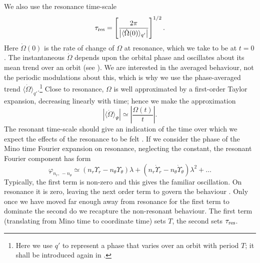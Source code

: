 We also use the resonance time-scale
\begin{equation}
\tau_\mathrm{res} = \left[\dfrac{2\pi}{\left|\langle\dot{\Omega}(0)\rangle_{q'}\right|}\right]^{1/2}.
\label{eq:t-res}
\end{equation}
Here $\dot{\Omega}(0)$ is the rate of change of $\Omega$ at resonance, which we take to be at $t = 0$. The instantaneous $\dot{\Omega}$ depends upon the orbital phase and oscillates about its mean trend over an orbit (see ). We are interested in the averaged behaviour, not the periodic modulations about this, which is why we use the phase-averaged trend $\langle\dot{\Omega}\rangle_{q'}$.\footnote{Here we use $q'$ to represent a phase that varies over an orbit with period $T$; it shall be introduced again in .} Close to resonance, $\Omega$ is well approximated by a first-order Taylor expansion, decreasing linearly with time; hence we make the approximation
\begin{equation}
\left|\langle\dot{\Omega}\rangle_\Psi\right| \simeq \left|\dfrac{\Omega(t)}{t}\right|.
\end{equation}
The resonant time-scale should give an indication of the time over which we expect the effects of the resonance to be felt \citep{Bosley1992}. If we consider the phase of the Mino time Fourier expansion on resonance, neglecting the constant, the resonant Fourier component has form
\begin{equation}
\varphi_{n_r,\,-n_\theta} \simeq \left(n_r\Upsilon_r - n_\theta\Upsilon_\theta\right)\lambda + \left(n_r\dot{\Upsilon}_r - n_\theta\dot{\Upsilon}_\theta\right)\lambda^2 + \ldots
\end{equation}
Typically, the first term is non-zero and this gives the familiar oscillation. On resonance it is zero, leaving the next order term to govern the behaviour \citep{Flanagan2012}. Only once we have moved far enough away from resonance for the first term to dominate the second do we recapture the non-resonant behaviour. The first term (translating from Mino time to coordinate time) sets $T$, the second sets $\tau_\mathrm{res}$.

